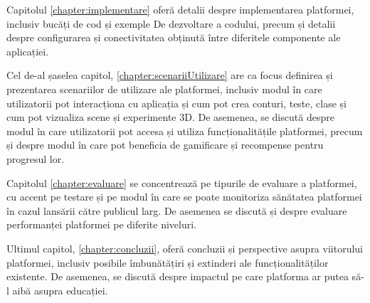 Capitolul \ref{chapter:implementare} oferă detalii despre implementarea platformei, inclusiv bucăți de cod și exemple De
dezvoltare a codului, precum și detalii despre configurarea și conectivitatea obținută între diferitele componente 
ale aplicației.

Cel de-al șaselea capitol, \ref{chapter:scenariiUtilizare} are ca focus definirea și prezentarea scenariilor de utilizare
ale platformei, inclusiv modul în care utilizatorii pot interacționa cu aplicația și cum pot crea conturi, teste, clase
și cum pot vizualiza scene și experimente 3D. De asemenea, se discută despre modul în care utilizatorii pot accesa și utiliza
funcționalitățile platformei, precum și despre modul în care pot beneficia de gamificare și recompense pentru progresul
lor.

Capitolul \ref{chapter:evaluare} se concentrează pe tipurile de evaluare a platformei, cu accent pe testare și pe modul în
care se poate monitoriza sănătatea platformei în cazul lansării către publicul larg. De asemenea se discută și despre
evaluare performanței platformei pe diferite niveluri.


Ultimul capitol, \ref{chapter:concluzii}, oferă concluzii și perspective asupra viitorului platformei, inclusiv
posibile îmbunătățiri și extinderi ale funcționalităților existente. De asemenea, se discută despre impactul pe care
platforma ar putea să-l aibă asupra educației.